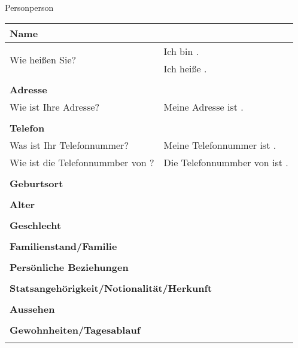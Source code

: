 \begin{discourse}{Person}{person}
\begin{tabular}{l|l}
	\multicolumn{2}{l}{\textbf{Name}} \\
	\hline
	\multirow{2}{*}{Wie heißen Sie?} & Ich bin \fillhere . \\
									 & Ich heiße \fillhere . \\
	\multicolumn{2}{l}{} \\

	\multicolumn{2}{l}{\textbf{Adresse}} \\
	\hline
	Wie ist Ihre Adresse? & Meine Adresse ist \fillhere . \\
	\multicolumn{2}{l}{} \\

	\multicolumn{2}{l}{\textbf{Telefon}} \\
	\hline
	Was ist Ihr Telefonnummer? & Meine Telefonnummer ist \fillhere . \\
	\hline
	Wie ist die Telefonnummber von \fillhere? & Die Telefonnummber von \fillhere ist \fillhere . \\
	\multicolumn{2}{l}{} \\


	\multicolumn{2}{l}{\textbf{Geburtsort}} \\
	\hline
	\multicolumn{2}{l}{} \\

	\multicolumn{2}{l}{\textbf{Alter}} \\
	\hline
	\multicolumn{2}{l}{} \\

	\multicolumn{2}{l}{\textbf{Geschlecht}} \\
	\hline
	\multicolumn{2}{l}{} \\

	\multicolumn{2}{l}{\textbf{Familienstand/Familie}} \\
	\hline
	\multicolumn{2}{l}{} \\

	\multicolumn{2}{l}{\textbf{Persönliche Beziehungen}} \\
	\hline
	\multicolumn{2}{l}{} \\

	\multicolumn{2}{l}{\textbf{Statsangehörigkeit/Notionalität/Herkunft}} \\
	\hline
	\multicolumn{2}{l}{} \\

	\multicolumn{2}{l}{\textbf{Aussehen}} \\
	\hline
	\multicolumn{2}{l}{} \\

	\multicolumn{2}{l}{\textbf{Gewohnheiten/Tagesablauf}} \\
	\hline
	\multicolumn{2}{l}{}
\end{tabular}
\end{discourse}
